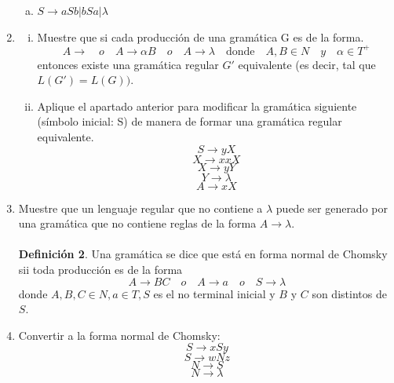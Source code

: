\documentclass{article}
\begin{document}
\begin{enumerate}[1.]
    \begin{enumerate}[a)]
      \item
        $S \rightarrow aSb | bSa | \lambda$
    \end{enumerate} 
  \item
    \begin{enumerate}[i.]
      \item
        Muestre que si cada producción de una gramática G es de la forma.
        \[ A \rightarrow \quad o \quad A \rightarrow \alpha B \quad o \quad A \rightarrow \lambda \quad \text{donde} 
        \quad A,B \in N \quad y \quad \alpha \in T^{+} \]
        entonces existe una gramática regular $G'$ equivalente (es decir, tal que $L(G') = L(G))$.
      \item
        Aplique el apartado anterior para modificar la gramática siguiente (símbolo inicial: S) de manera de formar
        una gramática regular equivalente.
        \[ S \rightarrow yX \]
        \[ X \rightarrow xxX \]
        \[ X \rightarrow yY \]
        \[ Y \rightarrow \lambda \]
        \[ A \rightarrow xX \]
    \end{enumerate}
  \item
    Muestre que un lenguaje regular que no contiene a $\lambda$ puede ser generado por una gramática que no contiene
    reglas de la forma $A \rightarrow \lambda$. \\ \\
    \textbf{Definición 2}. Una gramática se dice que está en forma normal de Chomsky sii toda producción es de la forma
    \[ A \rightarrow BC \quad o \quad A \rightarrow a \quad o \quad S \rightarrow \lambda \]
    donde $A,B,C \in N, a \in T, S$ es el no terminal inicial y $B$ y $C$ son distintos de $S$.
  \item
    Convertir a la forma normal de Chomsky:
    \[ S \rightarrow xSy \]
    \[ S \rightarrow wNz \]
    \[ N \rightarrow S\]
    \[ N \rightarrow \lambda \]
\end{enumerate}
\end{document}
